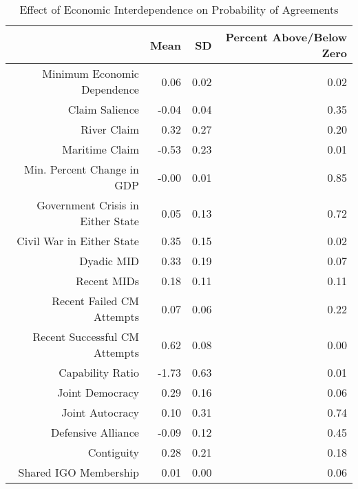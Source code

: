 \documentclass[../../dissertation.tex]{subfiles}
\begin{document}
\begin{table}[ht]
	\caption{Effect of Economic Interdependence on Probability of Agreements}
	\label{tab: agreements}
	\centering
			\begin{tabular}{rrrr}
			\toprule
			& Mean & SD & Percent Above/Below Zero \\ 
			
			\midrule
			
			Minimum Economic Dependence & 0.06 & 0.02 & 0.02 \\ 
			
			Claim Salience & -0.04 & 0.04 & 0.35 \\ 
			
			River Claim & 0.32 & 0.27 & 0.20 \\ 
			
			Maritime Claim & -0.53 & 0.23 & 0.01 \\ 
			
			Min. Percent Change in GDP & -0.00 & 0.01 & 0.85 \\ 
			
			Government Crisis in Either State & 0.05 & 0.13 & 0.72 \\ 
			
			Civil War in Either State & 0.35 & 0.15 & 0.02 \\ 
			
			Dyadic MID & 0.33 & 0.19 & 0.07 \\ 
			
			Recent MIDs & 0.18 & 0.11 & 0.11 \\ 
			
			Recent Failed CM Attempts & 0.07 & 0.06 & 0.22 \\ 
			
			Recent Successful CM Attempts & 0.62 & 0.08 & 0.00 \\ 
			
			Capability Ratio & -1.73 & 0.63 & 0.01 \\ 
			
			Joint Democracy & 0.29 & 0.16 & 0.06 \\ 
			
			Joint Autocracy & 0.10 & 0.31 & 0.74 \\ 
			
			Defensive Alliance & -0.09 & 0.12 & 0.45 \\ 
			
			Contiguity & 0.28 & 0.21 & 0.18 \\ 
			
			Shared IGO Membership & 0.01 & 0.00 & 0.06 \\ 
			

\end{tabular}
\end{table}
\end{document}
